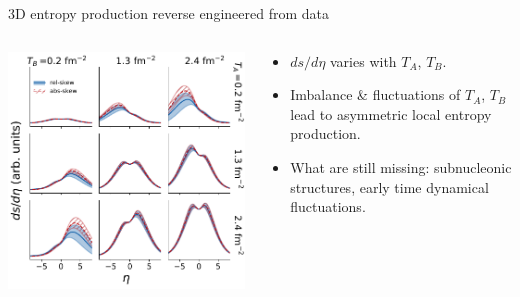 \documentclass[11pt]{beamer}
\begin{document}
\begin{frame}{3D entropy production reverse engineered from data}

\begin{columns}
\begin{column}{0.55\textwidth}
\includegraphics[width=\textwidth]{post_dsdy.pdf}
\end{column}
\begin{column}{0.45\textwidth}
\begin{itemize}
\item $ds/d\eta$ varies with $T_A$, $T_B$.
\item Imbalance \& fluctuations of $T_A$, $T_B$ lead to asymmetric local entropy production.
\item What are still missing: subnucleonic structures, early time dynamical fluctuations.
\end{itemize}
\end{column}
\end{columns}

\end{frame}
\end{document}

